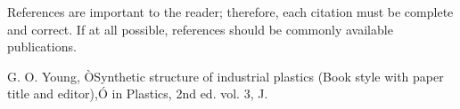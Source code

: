 \documentclass[12pt]{article}
\begin{document}
	
	
	References are important to the reader; therefore, each citation must be complete and correct. If at all possible, references should be commonly available publications.
	
	
	
	\begin{thebibliography}{99}
		
		 G. O. Young, ÒSynthetic structure of industrial plastics (Book style with paper title and editor),Ó 	in Plastics, 2nd ed. vol. 3, J.
		
	\end{thebibliography}
	
	
	
	
\end{document}
